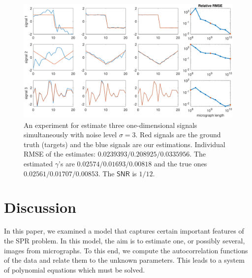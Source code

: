 \documentclass[english,11pt]{article}
\newcommand{\1}{\mathbf{1}}
\newcommand{\TODO}[1]{{\color{red}{[#1]}}}
\numberwithin{equation}{section}
\theoremstyle{plain}
\theoremstyle{definition}
\theoremstyle{remark}
\theoremstyle{plain}
\theoremstyle{remark}
\theoremstyle{plain}
\theoremstyle{plain}
\newcommand{\SNR}{\ensuremath{\textsf{SNR}}}
\begin{document}
\begin{figure}[t]
	\centering
	\includegraphics[width=\linewidth]{heterogeneous_progressive_n12300000000_466300}
	\caption{An experiment for estimate three one-dimensional signals simultaneously with noise level $\sigma=3$. Red signals are the ground truth (targets) and the blue signals are our estimations. Individual RMSE of the estimates: $0.0239393 / 0.208925 / 0.0335956$. The estimated $\gamma$'s are $0.02574 / 0.01693 / 0.00818$ and the true ones $0.02561 / 0.01707 / 0.00853$. The $\SNR$ is $1/12$. \TODO{1. to replace with a ``progress'' plot 2. replace the triangle signal 3. add error progress figure}}
	\label{fig:1Dheterosignals}
\end{figure}



\section{Discussion}

\TODO{Discussion: What might the answer imply and why does it matter? How does it fit in with what other researchers have found? What are the perspectives for future research?}


In this paper, we examined a model that captures certain important features of the SPR problem. In this model, the aim is to estimate one, or possibly several, images from micrographs. To this end, we compute the autocorrelation functions of the data and relate them to the unknown parameters. This leads to a system of polynomial equations which must be solved.
\end{document}
